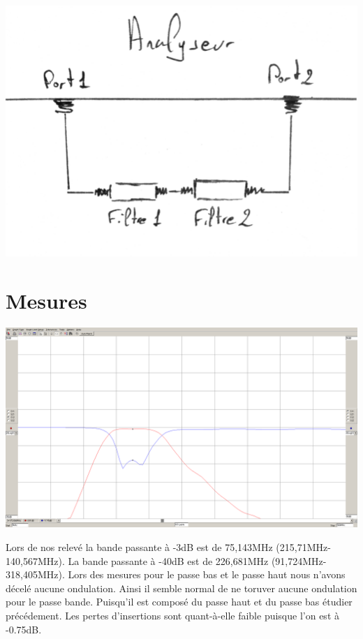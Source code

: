 \documentclass[a4paper,12pt]{report}            %
\begin{document}
\begin{center}\includegraphics[scale = 0.2]{pic/Cablage_filtre2.png}\\ \end{center}

\section{Mesures}

\begin{center}\includegraphics[scale = 0.25]{pic/parametre_passe_bande.png}\\ \end{center}
Lors de nos relevé la bande passante à -3dB est de 75,143MHz (215,71MHz-140,567MHz). 
La bande passante à -40dB est de 226,681MHz (91,724MHz-318,405MHz). Lors des mesures pour
le passe bas et le passe haut nous n'avons décelé aucune ondulation. Ainsi il semble normal 
de ne toruver aucune ondulation pour le passe bande. Puisqu'il est composé du passe haut et
du passe bas étudier précédement.
Les pertes d'insertions sont quant-à-elle faible puisque l'on est à -0.75dB.
\end{document}
